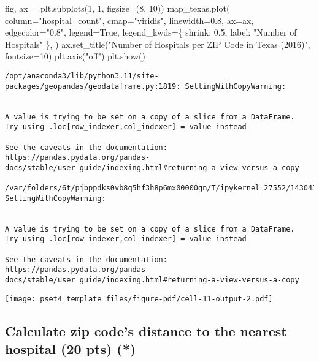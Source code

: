 \documentclass[
  letterpaper,
  DIV=11,
  numbers=noendperiod]{scrartcl}
\newenvironment{Shaded}{\begin{snugshade}}{\end{snugshade}}
\newcommand{\DecValTok}[1]{\textcolor[rgb]{0.68,0.00,0.00}{#1}}
\newcommand{\FloatTok}[1]{\textcolor[rgb]{0.68,0.00,0.00}{#1}}
\newcommand{\NormalTok}[1]{\textcolor[rgb]{0.00,0.23,0.31}{#1}}
\newcommand{\OperatorTok}[1]{\textcolor[rgb]{0.37,0.37,0.37}{#1}}
\newcommand{\StringTok}[1]{\textcolor[rgb]{0.13,0.47,0.30}{#1}}
\newcommand{\VariableTok}[1]{\textcolor[rgb]{0.07,0.07,0.07}{#1}}
\begin{document}
\begin{Shaded}
\begin{Highlighting}[]
\NormalTok{fig, ax }\OperatorTok{=}\NormalTok{ plt.subplots(}\DecValTok{1}\NormalTok{, }\DecValTok{1}\NormalTok{, figsize}\OperatorTok{=}\NormalTok{(}\DecValTok{8}\NormalTok{, }\DecValTok{10}\NormalTok{))}
\NormalTok{map\_texas.plot(}
\NormalTok{    column}\OperatorTok{=}\StringTok{"hospital\_count"}\NormalTok{,}
\NormalTok{    cmap}\OperatorTok{=}\StringTok{"viridis"}\NormalTok{,}
\NormalTok{    linewidth}\OperatorTok{=}\FloatTok{0.8}\NormalTok{,}
\NormalTok{    ax}\OperatorTok{=}\NormalTok{ax,}
\NormalTok{    edgecolor}\OperatorTok{=}\StringTok{"0.8"}\NormalTok{,}
\NormalTok{    legend}\OperatorTok{=}\VariableTok{True}\NormalTok{,}
\NormalTok{    legend\_kwds}\OperatorTok{=}\NormalTok{\{}
        \StringTok{\textquotesingle{}shrink\textquotesingle{}}\NormalTok{: }\FloatTok{0.5}\NormalTok{,  }
        \StringTok{\textquotesingle{}label\textquotesingle{}}\NormalTok{: }\StringTok{"Number of Hospitals"} 
\NormalTok{    \},}
\NormalTok{)}
\NormalTok{ax.set\_title(}\StringTok{"Number of Hospitals per ZIP Code in Texas (2016)"}\NormalTok{, fontsize}\OperatorTok{=}\DecValTok{10}\NormalTok{)}
\NormalTok{plt.axis(}\StringTok{"off"}\NormalTok{)}
\NormalTok{plt.show()}
\end{Highlighting}
\end{Shaded}

\begin{verbatim}
/opt/anaconda3/lib/python3.11/site-packages/geopandas/geodataframe.py:1819: SettingWithCopyWarning:


A value is trying to be set on a copy of a slice from a DataFrame.
Try using .loc[row_indexer,col_indexer] = value instead

See the caveats in the documentation: https://pandas.pydata.org/pandas-docs/stable/user_guide/indexing.html#returning-a-view-versus-a-copy

/var/folders/6t/pjbppdks0vb8q5hf3h8p6mx00000gn/T/ipykernel_27552/1430434340.py:14: SettingWithCopyWarning:


A value is trying to be set on a copy of a slice from a DataFrame.
Try using .loc[row_indexer,col_indexer] = value instead

See the caveats in the documentation: https://pandas.pydata.org/pandas-docs/stable/user_guide/indexing.html#returning-a-view-versus-a-copy
\end{verbatim}

\texttt{[image: pset4\_template\_files/figure-pdf/cell-11-output-2.pdf]}

\subsection{Calculate zip code's distance to the nearest hospital (20
pts)
(*)}\label{calculate-zip-codes-distance-to-the-nearest-hospital-20-pts}
\end{document}
